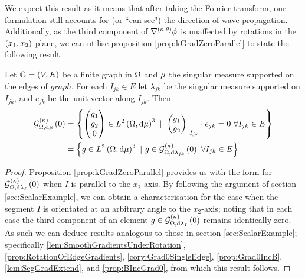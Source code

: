 We expect this result as it means that after taking the Fourier transform, our formulation still accounts for (or ``can see") the direction of wave propagation.
Additionally, as the third component of $\nabla^{\left( \kappa, \theta \right)}\phi$ is unaffected by rotations in the $\left( x_1,x_2 \right)$-plane, we can utilise proposition \ref{prop:kGradZeroParallel} to state the following result.
\begin{cory} \label{cory:CharacterisationkGradientsZero}
	Let $\mathbb{G}=\left( V,E \right)$ be a finite graph in $\Omega$ and $\mu$ the singular measure supported on the edges of $graph$.
	For each $I_{jk}\in E$ let $\lambda_{jk}$ be the singular measure supported on $I_{jk}$, and $e_{jk}$ be the unit vector along $I_{jk}$.
	Then
	\begin{align*}
		\kgradZero{\ddom}{\ddmes} &= \clbracs{ 
		\begin{pmatrix} g_1 \\ g_2 \\ 0 \end{pmatrix}		
		\in\ltwo{\ddom}{\ddmes}^3 \ \vert \ \left.
		\begin{pmatrix} g_1 \\ g_2 \end{pmatrix}
		\right\rvert_{I_{jk}}\cdot e_{jk} = 0 \ \forall I_{jk}\in E } \\
		&= \clbracs{ g\in\ltwo{\ddom}{\ddmes}^3 \ \vert \ g\in\kgradZero{\ddom}{\lambda_{jk}} \ \forall I_{jk}\in E }
	\end{align*}
\end{cory}
\begin{proof}
	Proposition \ref{prop:kGradZeroParallel} provides us with the form for $\mathcal{G}_{ \Omega, \mathrm{d}\lambda_I}^{(\kappa)}\left( 0 \right)$ when $I$ is parallel to the $x_2$-axis.
	By following the argument of section \ref{sec:ScalarExample}, we can obtain a characterisation for the case when the segment $I$ is orientated at an arbitrary angle to the $x_2$-axis; noting that in each case the third component of an element $g\in\mathcal{G}_{ \Omega, \mathrm{d}\lambda_I}^{(\kappa)}\left( 0 \right)$ remains identically zero.
	As such we can deduce results analogous to those in section \ref{sec:ScalarExample}; specifically \ref{lem:SmoothGradientsUnderRotation}, \ref{prop:RotationOfEdgeGradients}, \ref{cory:Grad0SingleEdge}, \ref{prop:Grad0IncB}, \ref{lem:SegGradExtend}, and \ref{prop:BIncGrad0}, from which this result follows.
\end{proof}

